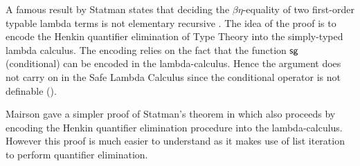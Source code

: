 


A famous result by Statman  states that deciding the $\beta\eta$-equality of two first-order typable lambda terms is not elementary recursive \cite{Statman:1979:TLE}. 
The idea of the proof is to encode the Henkin quantifier elimination of Type Theory into the simply-typed lambda calculus. The encoding relies on the fact that the function $\sf sg$ (conditional) can be encoded in the lambda-calculus. Hence the argument does not carry on   in the Safe Lambda Calculus since the conditional operator is not definable (\cite{blumong:safelambdacalculus}).

Mairson gave a simpler proof of Statman's theorem in \cite{mairson1992spt} which also proceeds by encoding the Henkin quantifier elimination procedure into the lambda-calculus. However this proof is much easier to understand as it makes use of list iteration to perform quantifier elimination.
